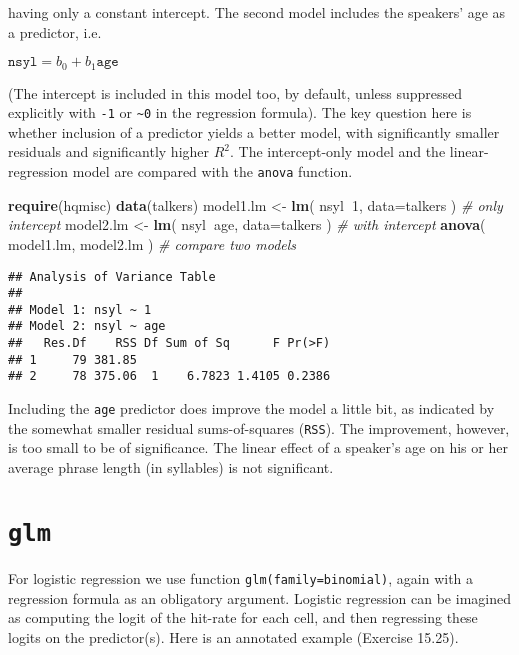 \documentclass[]{book}
\newenvironment{Shaded}{\begin{snugshade}}{\end{snugshade}}
\newcommand{\CommentTok}[1]{\textcolor[rgb]{0.56,0.35,0.01}{\textit{#1}}}
\newcommand{\DataTypeTok}[1]{\textcolor[rgb]{0.13,0.29,0.53}{#1}}
\newcommand{\DecValTok}[1]{\textcolor[rgb]{0.00,0.00,0.81}{#1}}
\newcommand{\KeywordTok}[1]{\textcolor[rgb]{0.13,0.29,0.53}{\textbf{#1}}}
\newcommand{\NormalTok}[1]{#1}
\newcommand{\OperatorTok}[1]{\textcolor[rgb]{0.81,0.36,0.00}{\textbf{#1}}}
\newcommand{\StringTok}[1]{\textcolor[rgb]{0.31,0.60,0.02}{#1}}
\begin{document}
having only a
constant intercept. The second model includes the speakers' age as a
predictor, i.e.

\(\texttt{nsyl} = b_0 + b_1 \texttt{age}\)

(The intercept is included in this model too, by default, unless
suppressed explicitly with \texttt{-1} or
\texttt{\textasciitilde{}0} in the regression formula). The key
question here is whether inclusion of a predictor yields a better
model, with significantly smaller residuals and significantly higher
\(R^2\). The intercept-only model and the linear-regression model are
compared with the \texttt{anova} function.

\begin{Shaded}
\begin{Highlighting}[]
\KeywordTok{require}\NormalTok{(hqmisc)}
\KeywordTok{data}\NormalTok{(talkers)}
\NormalTok{model1.lm <-}\StringTok{ }\KeywordTok{lm}\NormalTok{( nsyl}\OperatorTok{~}\DecValTok{1}\NormalTok{, }\DataTypeTok{data=}\NormalTok{talkers ) }\CommentTok{# only intercept}
\NormalTok{model2.lm <-}\StringTok{ }\KeywordTok{lm}\NormalTok{( nsyl}\OperatorTok{~}\NormalTok{age, }\DataTypeTok{data=}\NormalTok{talkers ) }\CommentTok{# with intercept}
\KeywordTok{anova}\NormalTok{( model1.lm, model2.lm ) }\CommentTok{# compare two models}
\end{Highlighting}
\end{Shaded}

\begin{verbatim}
## Analysis of Variance Table
## 
## Model 1: nsyl ~ 1
## Model 2: nsyl ~ age
##   Res.Df    RSS Df Sum of Sq      F Pr(>F)
## 1     79 381.85                           
## 2     78 375.06  1    6.7823 1.4105 0.2386
\end{verbatim}

Including the \texttt{age} predictor does improve the model a little bit,
as indicated by the somewhat smaller residual sums-of-squares
(\texttt{RSS}). The improvement, however, is too small to be of
significance. The linear effect of a speaker's age on his or her
average phrase length (in syllables) is not significant.

\hypertarget{glm}{%
\section{\texorpdfstring{\texttt{glm}}{glm}}\label{glm}}

For logistic regression we use function
\texttt{glm(family=binomial)}, again with a
regression formula as an obligatory argument. Logistic regression
can be imagined as computing the logit of the hit-rate for each
cell, and then regressing these logits on the predictor(s). Here is
an annotated example \citep{MMC03} (Exercise 15.25).
\end{document}
